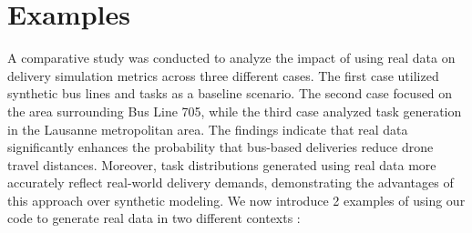 \section{Examples}
\label{sub:examples}

A comparative study was conducted to analyze the impact of using real data on delivery simulation metrics across three different cases. The first case utilized synthetic bus lines and tasks as a baseline scenario. The second case focused on the area surrounding Bus Line 705, while the third case analyzed task generation in the Lausanne metropolitan area. The findings indicate that real data significantly enhances the probability that bus-based deliveries reduce drone travel distances. Moreover, task distributions generated using real data more accurately reflect real-world delivery demands, demonstrating the advantages of this approach over synthetic modeling.
We now introduce 2 examples of using our code to generate real data in two different contexts :